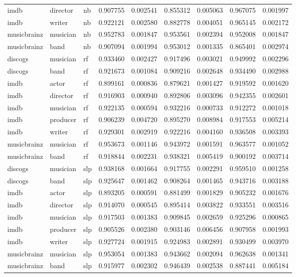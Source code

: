 \documentclass[epsfig,a4paper,11pt,titlepage,twoside,openany]{book}
\begin{document}
\begin{longtable}{|l|l|l|l|l|l|l|l|l|}
imdb        & director & nb    & 0.907755 & 0.002541 & 0.855312  & 0.005063 & 0.967075 & 0.001997 \\
imdb        & writer   & nb    & 0.922121 & 0.002580 & 0.882778  & 0.004051 & 0.965145 & 0.002172 \\
musicbrainz & musician & nb    & 0.952783 & 0.001847 & 0.953561  & 0.002394 & 0.952008 & 0.001847 \\
musicbrainz & band     & nb    & 0.907094 & 0.001994 & 0.953012  & 0.001335 & 0.865401 & 0.002974 \\ \hline
discogs     & musician & rf    & 0.933460 & 0.002427 & 0.917496  & 0.003021 & 0.949992 & 0.002296 \\
discogs     & band     & rf    & 0.921673 & 0.001084 & 0.909216  & 0.002648 & 0.934490 & 0.002988 \\
imdb        & actor    & rf    & 0.899161 & 0.000836 & 0.879621  & 0.001427 & 0.919592 & 0.001620 \\
imdb        & director & rf    & 0.916903 & 0.000940 & 0.892806  & 0.003096 & 0.942355 & 0.002601 \\
imdb        & musician & rf    & 0.922135 & 0.000594 & 0.932216  & 0.000733 & 0.912272 & 0.001018 \\
imdb        & producer & rf    & 0.906239 & 0.004720 & 0.895270  & 0.008984 & 0.917553 & 0.005214 \\
imdb        & writer   & rf    & 0.929301 & 0.002919 & 0.922216  & 0.004160 & 0.936508 & 0.003393 \\
musicbrainz & musician & rf    & 0.953673 & 0.001146 & 0.943972  & 0.001591 & 0.963577 & 0.001052 \\ 
musicbrainz & band     & rf    & 0.918844 & 0.002231 & 0.938321  & 0.005419 & 0.900192 & 0.003714 \\ \hline
discogs     & musician & slp   & 0.938168 & 0.001664 & 0.917755  & 0.002291 & 0.959510 & 0.001258 \\
discogs     & band     & slp   & 0.925647 & 0.001462 & 0.908264  & 0.001465 & 0.943716 & 0.003188 \\
imdb        & actor    & slp   & 0.893205 & 0.000591 & 0.881499  & 0.001829 & 0.905232 & 0.001676 \\
imdb        & director & slp   & 0.914070 & 0.000545 & 0.895414  & 0.003822 & 0.933551 & 0.003516 \\
imdb        & musician & slp   & 0.917503 & 0.001383 & 0.909845  & 0.002659 & 0.925296 & 0.000865 \\
imdb        & producer & slp   & 0.905526 & 0.002380 & 0.903146  & 0.006456 & 0.907958 & 0.001993 \\
imdb        & writer   & slp   & 0.927724 & 0.001915 & 0.924983  & 0.002891 & 0.930499 & 0.003970 \\
musicbrainz & musician & slp   & 0.953054 & 0.001383 & 0.943662  & 0.002094 & 0.962638 & 0.001341 \\
musicbrainz & band     & slp   & 0.915977 & 0.002302 & 0.946439  & 0.002538 & 0.887441 & 0.005184 \\ \hline
\end{longtable}
\end{document}
